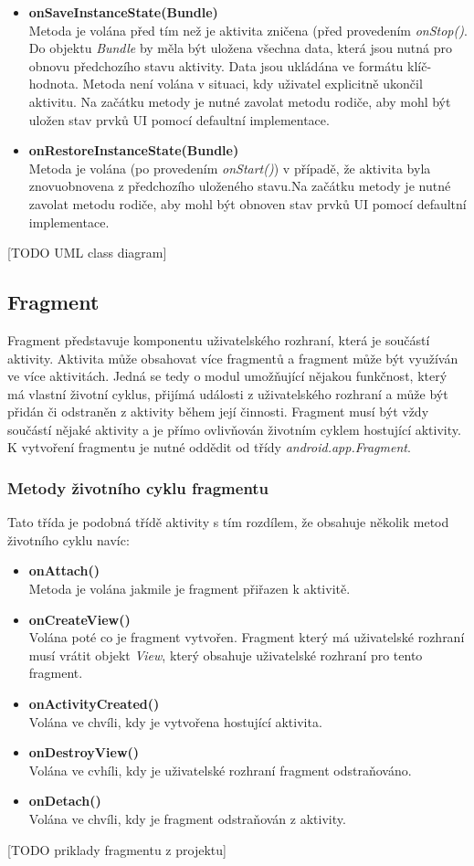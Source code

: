 \documentclass{diplomka}
\begin{document}
\begin{itemize}[]
\item \textbf{onSaveInstanceState(Bundle)}\\
Metoda je volána před tím než je aktivita zničena (před provedením \emph{onStop()}. Do objektu \emph{Bundle} by měla být uložena všechna data, která jsou nutná pro obnovu předchozího stavu aktivity. Data jsou ukládána ve formátu klíč-hodnota. Metoda není volána v situaci, kdy uživatel explicitně ukončil aktivitu. Na začátku metody je nutné zavolat metodu rodiče, aby mohl být uložen stav prvků UI pomocí defaultní implementace.
\item \textbf{onRestoreInstanceState(Bundle)}\\
Metoda je volána (po provedením \emph{onStart()}) v případě, že aktivita byla znovuobnovena z předchozího uloženého stavu.Na začátku metody je nutné zavolat metodu rodiče, aby mohl být obnoven stav prvků UI pomocí defaultní implementace.
\end{itemize}
[TODO UML class diagram]

\subsection{Fragment}
Fragment představuje komponentu uživatelského rozhraní, která je součástí aktivity. Aktivita může obsahovat více fragmentů a fragment může být využíván ve více aktivitách. Jedná se tedy o modul umožňující nějakou funkčnost, který má vlastní životní cyklus, přijímá události z uživatelského rozhraní a může být přidán či odstraněn z aktivity během její činnosti. Fragment musí být vždy součástí nějaké aktivity a je přímo ovlivňován životním cyklem hostující aktivity.\\ \indent
K vytvoření fragmentu je nutné oddědit od třídy \emph{android.app.Fragment}. 

\subsubsection*{Metody životního cyklu fragmentu}
Tato třída je podobná třídě aktivity s tím rozdílem, že obsahuje několik metod životního cyklu navíc:
\begin{itemize}[]
\item \textbf{onAttach()}\\
Metoda je volána jakmile je fragment přiřazen k aktivitě. 
\item \textbf{onCreateView()}\\
Volána poté co je fragment vytvořen. Fragment který má uživatelské rozhraní musí vrátit objekt \emph{View}, který obsahuje uživatelské rozhraní pro tento fragment.
\item \textbf{onActivityCreated()}\\
Volána ve chvíli, kdy je vytvořena hostující aktivita.
\item \textbf{onDestroyView()}\\
Volána ve cvhíli, kdy je uživatelské rozhraní fragment odstraňováno.
\item \textbf{onDetach()}\\
Volána ve chvíli, kdy je fragment odstraňován z aktivity.
\end{itemize}
[TODO priklady fragmentu z projektu]
\end{document}
